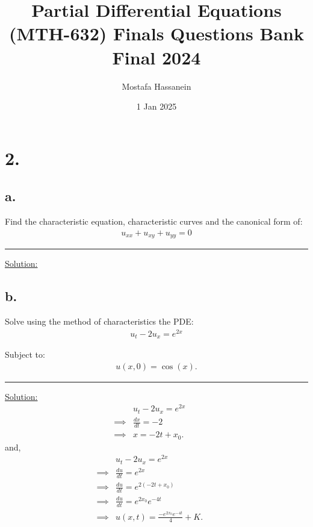 \documentclass{article}
\author{Mostafa Hassanein}
\title{
  Partial Differential Equations (MTH-632) Finals Questions Bank \\
  Final 2024}
\date{1 Jan 2025}
\begin{document}
\maketitle
\newpage

\section*{2.}

\subsection*{a.}
Find the characteristic equation, characteristic curves and the canonical form of:
\begin{align*}
  u_{xx} + u_{xy} + u_{yy} = 0
\end{align*}

\begin{center}
  \noindent\rule{8cm}{0.4pt}
\end{center}

\underline{Solution:}

\newpage

\subsection*{b.}
Solve using the method of characteristics the PDE:
\begin{align*}
  u_t - 2 u_x = e^{2x}
\end{align*}

Subject to:
\begin{align*}
  u(x,0) = \cos(x).
\end{align*}

\begin{center}
  \noindent\rule{8cm}{0.4pt}
\end{center}

\underline{Solution:}
\begin{align*}
  &u_t - 2 u_x = e^{2x} &&\\
  \implies& \frac{dx}{dt} = -2 &&\\
  \implies& x = -2t + x_{0}.
\end{align*}
and,
\begin{align*}
  &u_t - 2 u_x = e^{2x} &&\\
  \implies& \frac{du}{dt} = e^{2x} &&\\
  \implies& \frac{du}{dt} = e^{2(-2t + x_{0})} &&\\
  \implies& \frac{du}{dt} = e^{2x_{0}}e^{-4t} &&\\
  \implies& u(x,t) = \frac{-e^{2x_{0}}e^{-4t}}{4} + K.
\end{align*}
\end{document}
